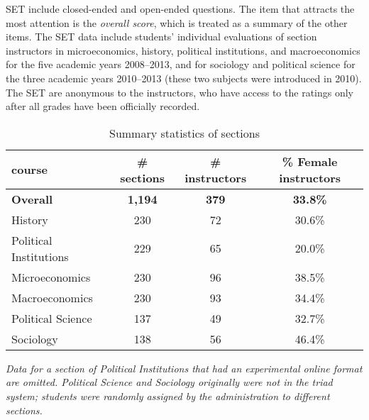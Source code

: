 \documentclass[12pt]{article}
\begin{document}
SET include closed-ended and open-ended questions.
The item that attracts the most attention is the \emph{overall score}, 
which is treated as a summary of the other items.
The SET data include students' individual evaluations of section
instructors in microeconomics, history, political institutions, and 
macroeconomics for the five academic years 2008--2013, and for 
sociology and political science for the three academic years 2010--2013 
(these two subjects were introduced in 2010). 
The SET are anonymous to the instructors, who have access to the ratings only after 
all grades have been officially recorded.  

\begin{table}[htbp]
  \centering
  \footnotesize 
  \caption{Summary statistics of sections}
    \begin{tabular}{lccc}
    \toprule 
    course     & \# sections & \# instructors  & \% Female instructors  \\
   \midrule
  \textbf{Overall} &  \textbf{1,194} & \textbf{379}  &\textbf{33.8\%} \\
    History    &               230 &      72          &   30.6\% \\
    Political Institutions  &  229 &      65          &   20.0\% \\    
    Microeconomics   &         230 &      96          &   38.5\% \\
    Macroeconomics   &         230 &      93          &   34.4\% \\
    Political Science &       137 &      49          &   32.7\% \\
    Sociology   &              138 &      56          &   46.4\%    \\
    \bottomrule
    \end{tabular}%
 \label{tab:description}%
 
\textit{Data for a section of Political Institutions that 
had an experimental online format are omitted.
Political Science and Sociology originally were not in the triad system; 
students were randomly assigned by the administration to different sections.
} 

\end{table}%
\normalsize
\end{document}
